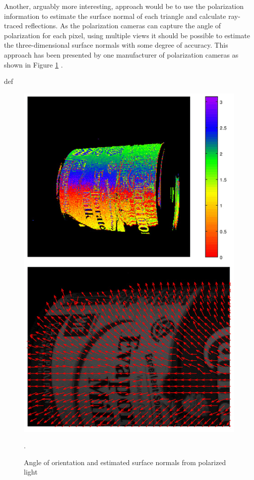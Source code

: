 Another, arguably more interesting, approach would be to use the polarization information to estimate the surface normal of each triangle and calculate ray-traced reflections.
As the polarization cameras can capture the angle of polarization for each pixel, using multiple views it should be possible to estimate the three-dimensional surface normals with some degree of accuracy.
This approach has been presented by one manufacturer of polarization cameras as shown in Figure \ref{fig:polarization} \cite{lucidvisionlabs3DDepthSurface2021}.

def
\begin{figure}
    \centering
    \includegraphics[width=.9\linewidth]{images/polarization_normals.png}
    \caption{Angle of orientation and estimated surface normals from polarized light \cite{lucidvisionlabs3DDepthSurface2021}}.
    \label{fig:polarization}
\end{figure}
